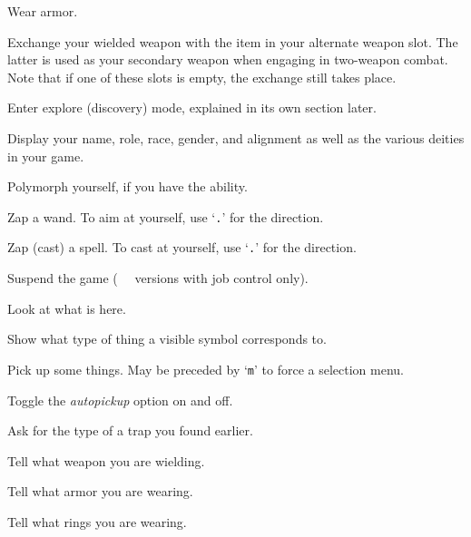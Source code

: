 \item[\tb{{\rm W}}]
Wear armor.

\item[\tb{{\rm x}}]
Exchange your wielded weapon with the item in your alternate
weapon slot.  The latter is used as your secondary weapon when engaging in
two-weapon combat.  Note that if one of these slots is empty,
the exchange still takes place.

\item[\tb{{\rm X}}]
Enter explore (discovery) mode, explained in its own section later.

\item[\tb{\^{}{\rm X}}]
Display your name, role, race, gender, and alignment as well as
the various deities in your game.

\item[\tb{\^{}{\rm Y}}]
Polymorph yourself, if you have the ability.

\item[\tb{{\rm z}}]
Zap a wand.  To aim at yourself, use `{\tt .}' for the direction.

\item[\tb{{\rm Z}}]
Zap (cast) a spell.  To cast at yourself, use `{\tt .}' for the direction.

\item[\tb{\^{}{\rm Z}}]
Suspend the game
(\UNIX\  versions with job control only).

\item[\tb{:}]
Look at what is here.

\item[\tb{;}]
Show what type of thing a visible symbol corresponds to.

\item[\tb{,}]
Pick up some things. May be preceded by `{\tt m}' to force a selection menu.

\item[\tb{@}]
Toggle the
{\it autopickup\/} 
option on and off.

\item[\tb{\^{}}]
Ask for the type of a trap you found earlier.

\item[\tb{)}]
Tell what weapon you are wielding.

\item[\tb{[}]
Tell what armor you are wearing.

\item[\tb{=}]
Tell what rings you are wearing.

